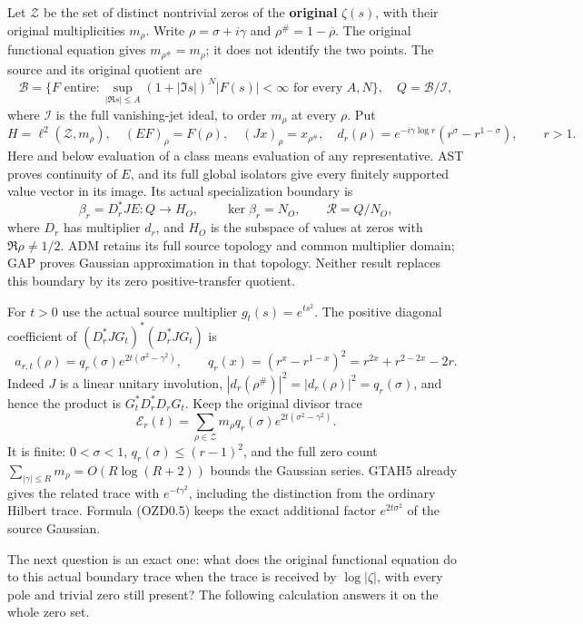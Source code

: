 Let \(\mathscr Z\) be the set of distinct nontrivial zeros of the
\textbf{original} \(\zeta(s)\), with their original multiplicities
\(m_\rho\). Write \(\rho=\sigma+i\gamma\) and
\(\rho^\#=1-\overline\rho\). The original functional equation gives
\(m_{\rho^\#}=m_\rho\); it does not identify the two points. The source
and its original quotient are \[
\mathcal B=\{F\text{ entire}:\sup_{|\Re s|\le A}(1+|\Im s|)^N|F(s)|<\infty\text{ for every }A,N\},
\quad Q=\mathcal B/\mathcal I,
\tag{OZD0.1}
\] where \(\mathcal I\) is the full vanishing-jet ideal, to order
\(m_\rho\) at every \(\rho\). Put \[
H=\ell^2(\mathscr Z,m_\rho),\quad (EF)_\rho=F(\rho),\quad
(Jx)_\rho=x_{\rho^\#},\quad
d_r(\rho)=e^{-i\gamma\log r}(r^\sigma-r^{1-\sigma}),\qquad r>1.
\tag{OZD0.2}
\] Here and below evaluation of a class means evaluation of any
representative. AST proves continuity of \(E\), and its full global
isolators give every finitely supported value vector in its image. Its
actual specialization boundary is \[
\beta_r=D_r^*JE:Q\longrightarrow H_O,\qquad
\ker\beta_r=N_O,\qquad \mathcal R=Q/N_O,
\tag{OZD0.3}
\] where \(D_r\) has multiplier \(d_r\), and \(H_O\) is the subspace of
values at zeros with \(\Re\rho\ne1/2\). ADM retains its full source
topology and common multiplier domain; GAP proves Gaussian approximation
in that topology. Neither result replaces this boundary by its zero
positive-transfer quotient.

For \(t>0\) use the actual source multiplier \(g_t(s)=e^{ts^2}\). The
positive diagonal coefficient of \((D_r^*JG_t)^*(D_r^*JG_t)\) is \[
a_{r,t}(\rho)=q_r(\sigma)e^{2t(\sigma^2-\gamma^2)},\qquad
q_r(x)=(r^x-r^{1-x})^2=r^{2x}+r^{2-2x}-2r.
\tag{OZD0.4}
\] Indeed \(J\) is a linear unitary involution,
\(|d_r(\rho^\#)|^2=|d_r(\rho)|^2=q_r(\sigma)\), and hence the product is
\(G_t^*D_r^*D_rG_t\). Keep the original divisor trace \[
\mathcal E_r(t)=\sum_{\rho\in\mathscr Z}m_\rho q_r(\sigma)e^{2t(\sigma^2-\gamma^2)}.
\tag{OZD0.5}
\] It is finite: \(0<\sigma<1\), \(q_r(\sigma)\le(r-1)^2\), and the full
zero count \(\sum_{|\gamma|\le R}m_\rho=O(R\log(R+2))\) bounds the
Gaussian series. GTAH5 already gives the related trace with
\(e^{-t\gamma^2}\), including the distinction from the ordinary Hilbert
trace. Formula (OZD0.5) keeps the exact additional factor
\(e^{2t\sigma^2}\) of the source Gaussian.

The next question is an exact one: what does the original functional
equation do to this actual boundary trace when the trace is received by
\(\log|\zeta|\), with every pole and trivial zero still present? The
following calculation answers it on the whole zero set.

